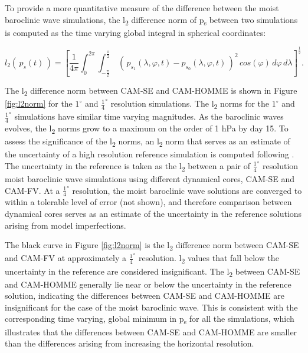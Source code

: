 To provide a more quantitative measure of the difference between the moist baroclinic wave simulations, the l\textsubscript{2} difference norm of p\textsubscript{s} between two simulations is computed as the time varying global integral in spherical coordinates:

\begin{equation} \label{}
l_2\left(\,p_s(t)\,\right) = \left[ \frac{1}{4\pi}\int^{2\pi}_{0} \int^{\frac{\pi}{2}}_{-\frac{\pi}{2}} \ \left(\,p_{s_1}(\lambda,\varphi,t) - p_{s_0}(\lambda,\varphi,t)\,\right)^2 \, cos(\varphi) \, d\varphi \, d\lambda \right]^\frac{1}{2}.
\end{equation}

The l\textsubscript{2} difference norm between CAM-SE and CAM-HOMME is shown in Figure \ref{fig:l2norm} for the $1^{\circ}$ and $\frac{1}{4}^{\circ}$ resolution simulations. The l\textsubscript{2} norms for the $1^{\circ}$ and $\frac{1}{4}^{\circ}$ simulations have similar time varying magnitudes. As the baroclinic waves evolves, the l\textsubscript{2} norms grow to a maximum on the order of 1 hPa by day 15. To assess the significance of the l\textsubscript{2} norms, an l\textsubscript{2} norm that serves as an estimate of the uncertainty of a high resolution reference simulation is computed following \cite{JW2006QJR}. The uncertainty in the reference is taken as the l\textsubscript{2} between a pair of $\frac{1}{4}^{\circ}$ resolution moist baroclinic wave simulations using different dynamical cores, CAM-SE and CAM-FV. At a $\frac{1}{4}^{\circ}$ resolution, the moist baroclinic wave solutions are converged to within a tolerable level of error (not shown), and therefore comparison between dynamical cores serves as an estimate of the uncertainty in the reference solutions arising from model imperfections. 

The black curve in Figure \ref{fig:l2norm} is the l\textsubscript{2} difference norm between CAM-SE and CAM-FV at approximately a $\frac{1}{4}^{\circ}$ resolution. l\textsubscript{2} values that fall below the uncertainty in the reference are considered insignificant. The l\textsubscript{2} between CAM-SE and CAM-HOMME generally lie near or below the uncertainty in the reference solution, indicating the differences between CAM-SE and CAM-HOMME are insignificant for the case of the moist baroclinic wave. This is consistent with the corresponding time varying, global minimum in p\textsubscript{s} for all the simulations, which illustrates that the differences between CAM-SE and CAM-HOMME are smaller than the differences arising from increasing the horizontal resolution.


